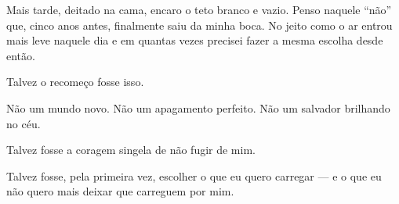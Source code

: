 Mais tarde, deitado na cama, encaro o teto branco e vazio. Penso naquele “não” que, cinco anos antes, finalmente saiu da minha boca. No jeito como o ar entrou mais leve naquele dia e em quantas vezes precisei fazer a mesma escolha desde então.

Talvez o recomeço fosse isso.

Não um mundo novo.  
Não um apagamento perfeito.  
Não um salvador brilhando no céu.

Talvez fosse a coragem singela de não fugir de mim.

Talvez fosse, pela primeira vez, escolher o que eu quero carregar —  
e o que eu não quero mais deixar que carreguem por mim.
